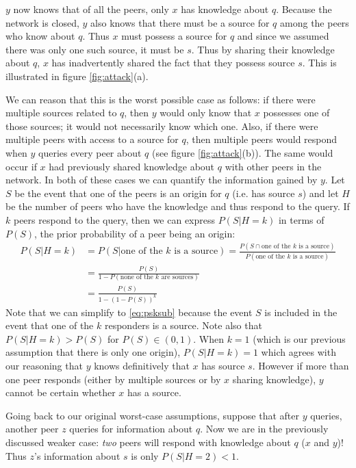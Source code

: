\documentclass{article}
\newcommand{\figref}[1]{figure \ref{fig:#1}}
\begin{document}
$y$ now knows that of all the peers, only $x$ has knowledge about $q$. Because
the network is closed, $y$ also knows that there must be a source for $q$ among
the peers who know about $q$. Thus $x$ must possess a source for $q$ and since
we assumed there was only one such source, it must be $s$. Thus by sharing their
knowledge about $q$, $x$ has inadvertently shared the fact that they possess
source $s$. This is illustrated in \figref{attack}(a).


We can reason that this is the worst possible case as follows: if there were
multiple sources related to $q$, then $y$ would only know that $x$ possesses one
of those sources; it would not necessarily know which one. Also, if there were
multiple peers with access to a source for $q$, then multiple peers would
respond when $y$ queries every peer about $q$ (see \figref{attack}(b)). The same would occur if $x$ had
previously shared knowledge about $q$ with other peers in the network. In both
of these cases we can quantify the information gained by $y$. Let $S$ be the
event that one of the peers is an origin for $q$ (i.e. has
source $s$) and let $H$ be the number of peers who have the knowledge and thus
respond to the query.
If $k$ peers respond to the query, then we can express $P(S|H=k)$ in terms of
$P(S)$, the prior probability of a peer being an origin:
\begin{align}
	P(S|H=k)&=P(S|\text{one of the $k$ is a source})=\frac{P(S\cap\text{one of
	the $k$ is a source})}{P(\text{one of the $k$ is a source})}\nonumber\\
	&=\frac{P(S)}{1-P(\text{none of the $k$ are sources})}\label{eq:psksub}\\
	&=\frac{P(S)}{1-(1-P(S))^k}\label{eq:psk}
\end{align}
Note that we can simplify to \eqref{eq:psksub} because the event $S$ is included
in the event that one of the $k$ responders is a source. Note also that
$P(S|H=k)>P(S)$ for $P(S)\in(0,1)$. When $k=1$ (which is our previous assumption
that there is only one origin), $P(S|H=k)=1$ which agrees with our reasoning
that $y$ knows definitively that $x$ has source $s$. However if more than one peer
responds (either by multiple sources or by $x$ sharing knowledge), $y$ cannot be
certain whether $x$ has a source.

Going back to our original worst-case assumptions, suppose that after $y$
queries, another peer $z$ queries for information about $q$. Now we are in the
previously discussed weaker case: {\it two} peers will respond with knowledge
about $q$ ($x$ and $y$)! Thus $z$'s information about $s$ is only $P(S|H=2)<1$.
\end{document}
